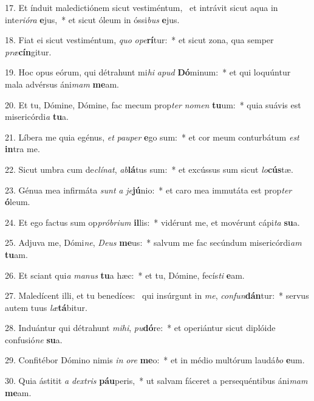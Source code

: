 17. Et índuit maledictiónem sicut vestiméntum, \dag\  et intrávit sicut aqua in inte\textit{ri}\textit{ó}\textit{ra} \textbf{e}jus,~*  et sicut óleum in óssi\textit{bus} \textbf{e}jus.\

18. Fiat ei sicut vestiméntum, \textit{quo} \textit{o}\textit{pe}\textbf{rí}tur:~*  et sicut zona, qua semper \textit{præ}\textbf{cín}gitur.\

19. Hoc opus eórum, qui détrahunt mi\textit{hi} \textit{a}\textit{pud} \textbf{Dó}minum:~*  et qui loquúntur mala advérsus áni\textit{mam} \textbf{me}am.\

20. Et tu, Dómine, Dómine, fac mecum prop\textit{ter} \textit{no}\textit{men} \textbf{tu}um:~*  quia suávis est misericórdi\textit{a} \textbf{tu}a.\

21. Líbera me quia egénus, \textit{et} \textit{pau}\textit{per} \textbf{e}go sum:~*  et cor meum conturbátum \textit{est} \textbf{in}tra me.\

22. Sicut umbra cum de\textit{clí}\textit{nat}, \textit{ab}\textbf{lá}tus sum:~*  et excússus sum sicut \textit{lo}\textbf{cús}tæ.\

23. Génua mea infirmáta \textit{sunt} \textit{a} \textit{je}\textbf{jú}nio:~*  et caro mea immutáta est prop\textit{ter} \textbf{ó}leum.\

24. Et ego factus sum op\textit{pró}\textit{bri}\textit{um} \textbf{il}lis:~*  vidérunt me, et movérunt cápi\textit{ta} \textbf{su}a.\

25. Adjuva me, Dómi\textit{ne}, \textit{De}\textit{us} \textbf{me}us:~*  salvum me fac secúndum misericórdi\textit{am} \textbf{tu}am.\

26. Et sciant qui\textit{a} \textit{ma}\textit{nus} \textbf{tu}a hæc:~*  et tu, Dómine, fecís\textit{ti} \textbf{e}am.\

27. Maledícent illi, et tu benedíces: \dag\  qui insúrgunt in \textit{me}, \textit{con}\textit{fun}\textbf{dán}tur:~*  servus autem tuus \textit{læ}\textbf{tá}bitur.\

28. Induántur qui détrahunt \textit{mi}\textit{hi}, \textit{pu}\textbf{dó}re:~*  et operiántur sicut diplóide confusió\textit{ne} \textbf{su}a.\

29. Confitébor Dómino nimis \textit{in} \textit{o}\textit{re} \textbf{me}o:~*  et in médio multórum laudá\textit{bo} \textbf{e}um.\

30. Quia ástitit \textit{a} \textit{dex}\textit{tris} \textbf{páu}peris,~*  ut salvam fáceret a persequéntibus áni\textit{mam} \textbf{me}am.\

